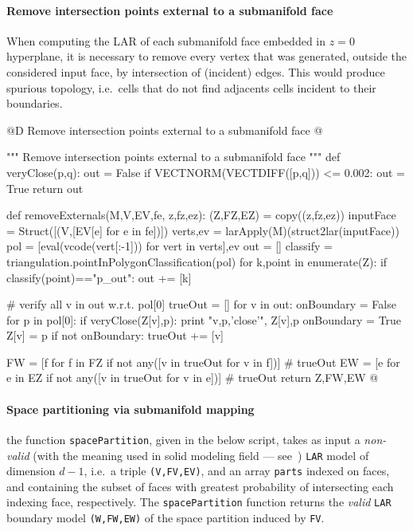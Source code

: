 \documentclass[11pt,oneside]{article}    %
\begin{document}
\paragraph{Remove intersection points external to a submanifold face}
When computing the LAR of each submanifold face embedded in $z=0$ hyperplane, it is necessary
to remove every vertex that was generated, outside the considered input face, by intersection of (incident) edges. This would produce spurious topology, i.e.~cells that do not find adjacents cells incident to their boundaries.

@D Remove intersection points external to a submanifold face
@{""" Remove intersection points external to a submanifold face """
def veryClose(p,q):
    out = False
    if VECTNORM(VECTDIFF([p,q])) <= 0.002:
        out = True
    return out

def removeExternals(M,V,EV,fe, z,fz,ez):
    (Z,FZ,EZ) = copy((z,fz,ez))
    inputFace = Struct([(V,[EV[e] for e in fe])])
    verts,ev = larApply(M)(struct2lar(inputFace))
    pol = [eval(vcode(vert[:-1])) for vert in verts],ev
    out = []
    classify = triangulation.pointInPolygonClassification(pol)
    for k,point in enumerate(Z):
        if classify(point)=="p_out":  out += [k]

    # verify all v in out w.r.t. pol[0]
    trueOut = []
    for v in out: 
        onBoundary = False
        for p in pol[0]:
            if veryClose(Z[v],p):
                print "v,p,'close'", Z[v],p
                onBoundary = True
                Z[v] = p
        if not onBoundary: trueOut += [v]
    
    FW = [f for f in FZ if not any([v in trueOut for v in f])]  # trueOut
    EW = [e for e in EZ if not any([v in trueOut for v in e])]  # trueOut
    return Z,FW,EW
@}

\paragraph{Space partitioning via submanifold mapping}

the function \texttt{spacePartition}, given in the below script, takes as input a \emph{non-valid} (with the meaning used in solid modeling field --- see~\cite{Requicha:1980:RRS:356827.356833}) \texttt{LAR} model of dimension $d-1$, i.e.~a triple \texttt{(V,FV,EV)}, and an array \texttt{parts} indexed on faces, and containing the subset of faces with greatest probability of intersecting each indexing face, respectively. The \texttt{spacePartition} function returns the \emph{valid} \texttt{LAR} boundary model \texttt{(W,FW,EW)} of the space partition induced by \texttt{FV}.
 
\end{document}
